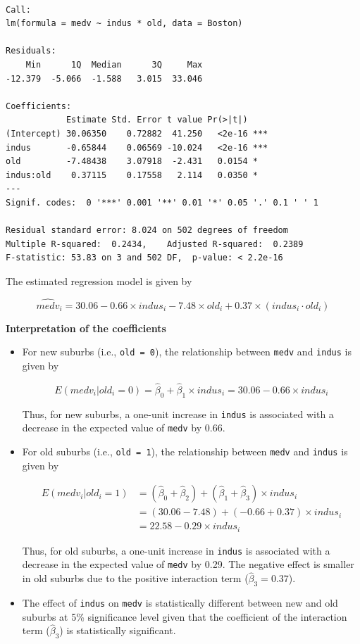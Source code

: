 \documentclass[
  12pt,
  letterpaper,
]{scrbook}
\theoremstyle{definition}
\theoremstyle{plain}
\theoremstyle{remark}
\begin{document}
\begin{verbatim}

Call:
lm(formula = medv ~ indus * old, data = Boston)

Residuals:
    Min      1Q  Median      3Q     Max 
-12.379  -5.066  -1.588   3.015  33.046 

Coefficients:
            Estimate Std. Error t value Pr(>|t|)    
(Intercept) 30.06350    0.72882  41.250   <2e-16 ***
indus       -0.65844    0.06569 -10.024   <2e-16 ***
old         -7.48438    3.07918  -2.431   0.0154 *  
indus:old    0.37115    0.17558   2.114   0.0350 *  
---
Signif. codes:  0 '***' 0.001 '**' 0.01 '*' 0.05 '.' 0.1 ' ' 1

Residual standard error: 8.024 on 502 degrees of freedom
Multiple R-squared:  0.2434,    Adjusted R-squared:  0.2389 
F-statistic: 53.83 on 3 and 502 DF,  p-value: < 2.2e-16
\end{verbatim}

The estimated regression model is given by

\[
\widehat{medv}_i = 30.06 - 0.66 \times indus_i - 7.48 \times old_i + 0.37 \times (indus_i \cdot old_i)
\]

{\textbf{Interpretation of the coefficients}}

\begin{itemize}
\item
  For new suburbs (i.e., \texttt{old\ =\ 0}), the relationship between
  \texttt{medv} and \texttt{indus} is given by

  \[
  E(medv_i | old_i = 0) = \hat{\beta}_0 + \hat{\beta}_1 \times indus_i = 30.06 - 0.66 \times indus_i
  \]

  Thus, for new suburbs, a one-unit increase in \texttt{indus} is
  associated with a decrease in the expected value of \texttt{medv} by
  0.66.
\item
  For old suburbs (i.e., \texttt{old\ =\ 1}), the relationship between
  \texttt{medv} and \texttt{indus} is given by

  \[
  \begin{split}
  E(medv_i | old_i = 1) &= (\hat{\beta}_0 + \hat{\beta}_2) + (\hat{\beta}_1 + \hat{\beta}_3) \times indus_i \\
  &= (30.06 - 7.48) + (-0.66 + 0.37) \times indus_i \\
  &= 22.58 - 0.29 \times indus_i
  \end{split}
  \]

  Thus, for old suburbs, a one-unit increase in \texttt{indus} is
  associated with a decrease in the expected value of \texttt{medv} by
  0.29. The negative effect is smaller in old suburbs due to the
  positive interaction term (\(\hat{\beta}_3 = 0.37\)).
\item
  The effect of \texttt{indus} on \texttt{medv} is statistically
  different between new and old suburbs at 5\% significance level given
  that the coefficient of the interaction term (\(\hat{\beta}_3\)) is
  statistically significant.
\end{itemize}
\end{document}
